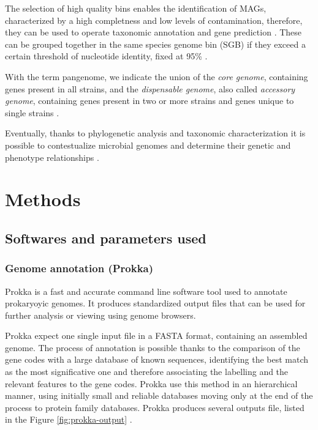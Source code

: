 \documentclass[a4paper,titlepage, oneside]{book}
\begin{document}
The selection of high quality bins enables the identification of MAGs, characterized by a high completness and low levels of contamination, therefore, they can be used to operate taxonomic annotation and gene prediction \cite{MAG2}. These can be grouped together in the same species genome bin (SGB) if they exceed a certain threshold of nucleotide identity, fixed at 95\% \cite{SGB2, SGB}.



With the term pangenome, we indicate the union of the \textit{core genome}, containing genes present in all strains, and the \textit{dispensable genome}, also called \textit{accessory genome}, containing genes present in two or more strains and genes unique to single strains \cite{Medini}.

Eventually, thanks to phylogenetic analysis and taxonomic characterization it is possible to contestualize microbial genomes and determine their genetic and phenotype relationships \cite{Phylo}.




\chapter{Methods}
\section{Softwares and parameters used}
\subsection{Genome annotation (Prokka)}

Prokka is a fast and accurate command line software tool used to annotate prokaryoyic genomes.  It produces standardized output files that can be used for further analysis or viewing using genome browsers.

Prokka expect one single input file in a FASTA format, containing an assembled genome. The process of annotation is possible thanks to the comparison of the gene codes with a large database of known sequences, identifying the best match as the most significative one and therefore associating the labelling and the relevant features to the gene codes. Prokka use this method in an hierarchical manner, using initially small and reliable databases moving only at the end of the process to protein family databases.
Prokka produces several outputs file, listed in the Figure \ref{fig:prokka-output}  \cite{Prokka}.
\end{document}
